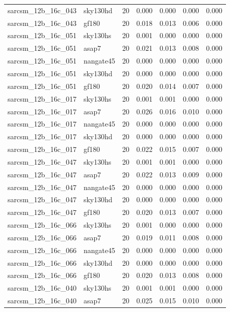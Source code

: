 \begin{tabular}{llrrrrr}
sarcsm\_12b\_16c\_043 & sky130hd & 20 & 0.000 & 0.000 & 0.000 & 0.000 \\
sarcsm\_12b\_16c\_043 & gf180 & 20 & 0.018 & 0.013 & 0.006 & 0.000 \\
sarcsm\_12b\_16c\_051 & sky130hs & 20 & 0.001 & 0.000 & 0.000 & 0.000 \\
sarcsm\_12b\_16c\_051 & asap7 & 20 & 0.021 & 0.013 & 0.008 & 0.000 \\
sarcsm\_12b\_16c\_051 & nangate45 & 20 & 0.000 & 0.000 & 0.000 & 0.000 \\
sarcsm\_12b\_16c\_051 & sky130hd & 20 & 0.000 & 0.000 & 0.000 & 0.000 \\
sarcsm\_12b\_16c\_051 & gf180 & 20 & 0.020 & 0.014 & 0.007 & 0.000 \\
sarcsm\_12b\_16c\_017 & sky130hs & 20 & 0.001 & 0.001 & 0.000 & 0.000 \\
sarcsm\_12b\_16c\_017 & asap7 & 20 & 0.026 & 0.016 & 0.010 & 0.000 \\
sarcsm\_12b\_16c\_017 & nangate45 & 20 & 0.000 & 0.000 & 0.000 & 0.000 \\
sarcsm\_12b\_16c\_017 & sky130hd & 20 & 0.000 & 0.000 & 0.000 & 0.000 \\
sarcsm\_12b\_16c\_017 & gf180 & 20 & 0.022 & 0.015 & 0.007 & 0.000 \\
sarcsm\_12b\_16c\_047 & sky130hs & 20 & 0.001 & 0.001 & 0.000 & 0.000 \\
sarcsm\_12b\_16c\_047 & asap7 & 20 & 0.022 & 0.013 & 0.009 & 0.000 \\
sarcsm\_12b\_16c\_047 & nangate45 & 20 & 0.000 & 0.000 & 0.000 & 0.000 \\
sarcsm\_12b\_16c\_047 & sky130hd & 20 & 0.000 & 0.000 & 0.000 & 0.000 \\
sarcsm\_12b\_16c\_047 & gf180 & 20 & 0.020 & 0.013 & 0.007 & 0.000 \\
sarcsm\_12b\_16c\_066 & sky130hs & 20 & 0.001 & 0.000 & 0.000 & 0.000 \\
sarcsm\_12b\_16c\_066 & asap7 & 20 & 0.019 & 0.011 & 0.008 & 0.000 \\
sarcsm\_12b\_16c\_066 & nangate45 & 20 & 0.000 & 0.000 & 0.000 & 0.000 \\
sarcsm\_12b\_16c\_066 & sky130hd & 20 & 0.000 & 0.000 & 0.000 & 0.000 \\
sarcsm\_12b\_16c\_066 & gf180 & 20 & 0.020 & 0.013 & 0.008 & 0.000 \\
sarcsm\_12b\_16c\_040 & sky130hs & 20 & 0.001 & 0.001 & 0.000 & 0.000 \\
sarcsm\_12b\_16c\_040 & asap7 & 20 & 0.025 & 0.015 & 0.010 & 0.000 \\

\end{tabular}
